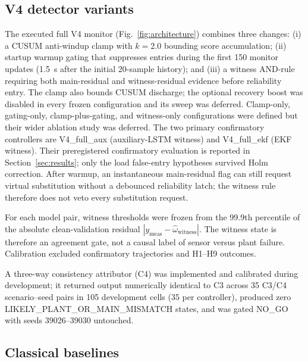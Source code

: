 \documentclass[conference]{IEEEtran}
\begin{document}
\subsection{V4 detector variants}
\label{sec:v4}

The executed full V4 monitor (Fig.~\ref{fig:architecture}) combines three
changes: (i) a CUSUM anti-windup clamp with $k=2.0$ bounding score
accumulation; (ii) startup warmup gating that suppresses entries during the
first 150 monitor updates (1.5~s after the initial 20-sample history); and (iii) a witness AND-rule requiring both
main-residual and witness-residual evidence before reliability entry.
The clamp also bounds CUSUM discharge; the optional recovery boost was
disabled in every frozen configuration and its sweep was deferred.
Clamp-only, gating-only, clamp-plus-gating, and witness-only configurations
were defined but their wider ablation study was deferred. The two primary
confirmatory controllers are V4\_full\_aux (auxiliary-LSTM witness) and
V4\_full\_ekf (EKF witness). Their preregistered confirmatory evaluation is
reported in Section~\ref{sec:results}; only the load false-entry hypotheses
survived Holm correction. After warmup, an instantaneous main-residual flag
can still request virtual substitution without a debounced reliability latch;
the witness rule therefore does not veto every substitution request.

For each model pair, witness thresholds were frozen from the 99.9th
percentile of the absolute clean-validation residual
$|y_{\mathrm{meas}}-\hat{\omega}_{\mathrm{witness}}|$. The witness state is
therefore an agreement gate, not a causal label of sensor versus plant
failure. Calibration excluded confirmatory trajectories and H1--H9 outcomes.

A three-way consistency attributor (C4) was implemented and calibrated
during development; it returned output numerically identical to C3 across
35 C3/C4 scenario--seed pairs in 105 development cells (35 per controller), produced zero
LIKELY\_PLANT\_OR\_MAIN\_MISMATCH states, and was gated NO\_GO with seeds
39026--39030 untouched.

\subsection{Classical baselines}
\label{sec:baselines}
\end{document}
